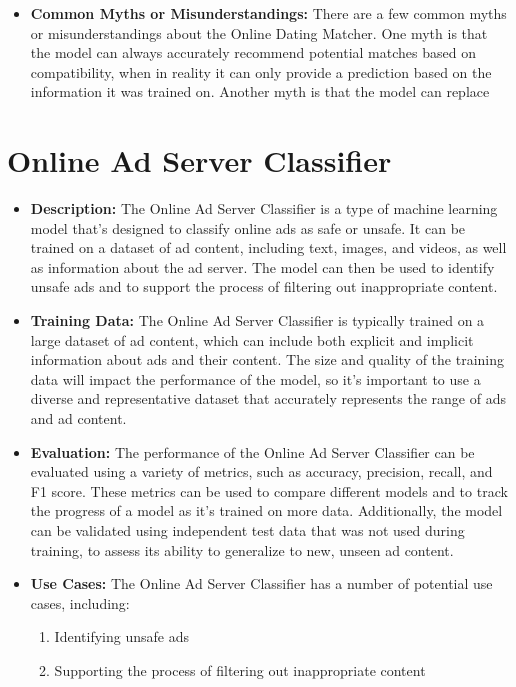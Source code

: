 \begin{itemize}
    \item \textbf{Common Myths or Misunderstandings:} There are a few common myths or misunderstandings about the Online Dating Matcher. One myth is that the model can always accurately recommend potential matches based on compatibility, when in reality it can only provide a prediction based on the information it was trained on. Another myth is that the model can replace
\end{itemize}

\section{Online Ad Server Classifier}

\begin{itemize}
    \item \textbf{Description:} The Online Ad Server Classifier is a type of machine learning model that's designed to classify online ads as safe or unsafe. It can be trained on a dataset of ad content, including text, images, and videos, as well as information about the ad server. The model can then be used to identify unsafe ads and to support the process of filtering out inappropriate content.
    \item \textbf{Training Data:} The Online Ad Server Classifier is typically trained on a large dataset of ad content, which can include both explicit and implicit information about ads and their content. The size and quality of the training data will impact the performance of the model, so it's important to use a diverse and representative dataset that accurately represents the range of ads and ad content.
    \item \textbf{Evaluation:} The performance of the Online Ad Server Classifier can be evaluated using a variety of metrics, such as accuracy, precision, recall, and F1 score. These metrics can be used to compare different models and to track the progress of a model as it's trained on more data. Additionally, the model can be validated using independent test data that was not used during training, to assess its ability to generalize to new, unseen ad content.
    \item \textbf{Use Cases:} The Online Ad Server Classifier has a number of potential use cases, including:
        \begin{enumerate}  
            \item Identifying unsafe ads
            \item Supporting the process of filtering out inappropriate content

\end{enumerate}
\end{itemize}
